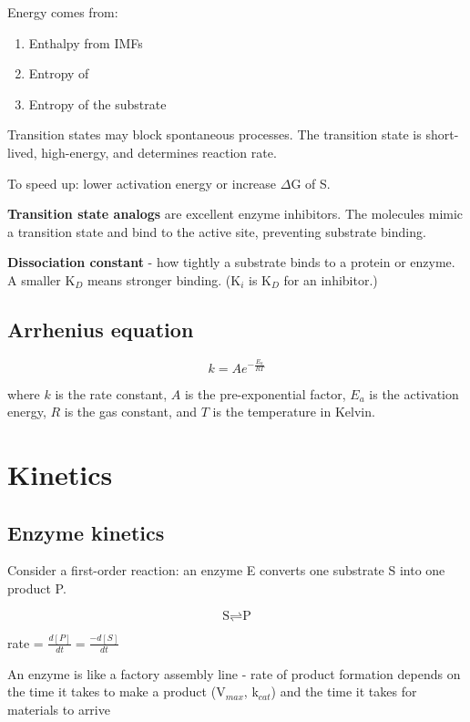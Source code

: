 \documentclass[letterpaper, 12pt]{article}
\begin{document}
Energy comes from:

\begin{enumerate}
\item Enthalpy from IMFs
\item Entropy of 
\item Entropy of the substrate
\end{enumerate}

Transition states may block spontaneous processes. The transition state is short-lived, high-energy, and determines reaction rate.

To speed up: lower activation energy or increase $\Delta$G of S.

\textbf{Transition state analogs} are excellent enzyme inhibitors. The molecules mimic a transition state and bind to the active site, preventing substrate binding.

\textbf{Dissociation constant} - how tightly a substrate binds to a protein or enzyme. A smaller K$_D$ means stronger binding. (K$_i$ is K$_D$ for an inhibitor.)

\subsection*{Arrhenius equation}

\begin{equation}
k = Ae^{-\frac{E_a}{RT}}
\end{equation}

where $k$ is the rate constant, $A$ is the pre-exponential factor, $E_a$ is the activation energy, $R$ is the gas constant, and $T$ is the temperature in Kelvin.

\newpage

\section*{Kinetics}

\subsection*{Enzyme kinetics}

Consider a first-order reaction: an enzyme E converts one substrate S into one product P.

$$\text{S} \rightleftharpoons \text{P}$$

rate = $\displaystyle \frac{d[P]}{dt} = \frac{-d[S]}{dt}$

An enzyme is like a factory assembly line - rate of product formation depends on the time it takes to make a product (V$_{max}$, k$_{cat}$) and the time it takes for materials to arrive
\end{document}
